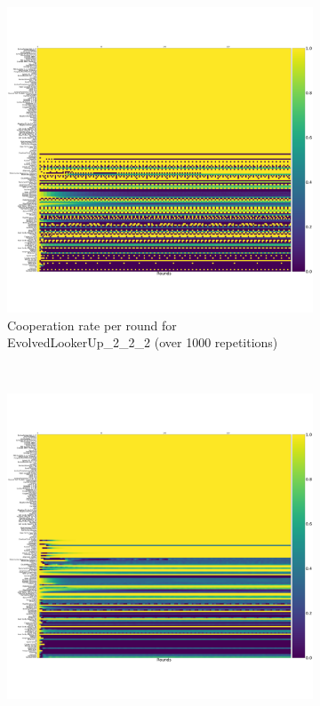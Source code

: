 \documentclass{article}
\begin{document}
\begin{figure}[!hbtp]
    \centering
    \begin{subfigure}[t]{.3\textwidth}
        \centering
        \includegraphics[width=\textwidth]{./assets/cooperation_0_0_1000_EvolvedLookerUp2_2_2_array.pdf}
        \caption{Cooperation rate per round for EvolvedLookerUp\_2\_2\_2 (over
        1000 repetitions)}
    \end{subfigure}%
    ~
    \begin{subfigure}[t]{.3\textwidth}
        \centering
        \includegraphics[width=\textwidth]{./assets/cooperation_0_0_1000_Evolved_HMM_5_array.pdf}

\end{subfigure}
\end{figure}
\end{document}
